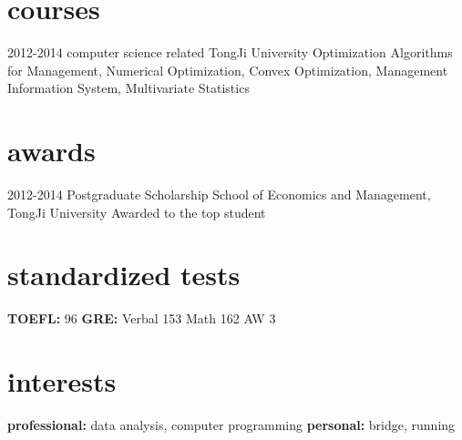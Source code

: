 \documentclass[]{friggeri-cv} %
\begin{document}
\section{courses}
\begin{entrylist}
\entry
{2012-2014}
{computer science related}
{TongJi University}
{Optimization Algorithms for Management,
Numerical Optimization,
Convex Optimization, 
Management Information System,
Multivariate Statistics}
\end{entrylist}




\section{awards}
\begin{entrylist}
\entry
{2012-2014}
{Postgraduate Scholarship}
{School of Economics and Management, TongJi University}
{Awarded to the top student}
\end{entrylist}


\section{standardized tests}
{\textbf{TOEFL:} 96  \textbf{GRE:} Verbal 153 Math 162 AW 3}



\section{interests}
{\textbf{professional:} data analysis, computer programming  \textbf{personal:} bridge, running}

\end{document}
